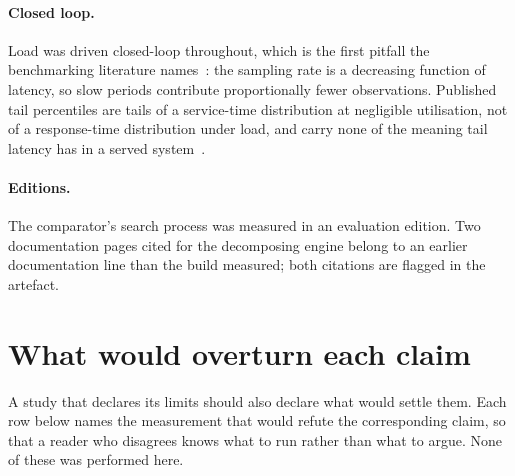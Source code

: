 \documentclass[11pt,a4paper]{article}
\begin{document}
\paragraph{Closed loop.} Load was driven closed-loop throughout, which is the first pitfall the
benchmarking literature names~\cite{schroeder2006openclosed,raasveldt2018fair}: the sampling rate is a
decreasing function of latency, so slow periods contribute proportionally fewer observations. Published tail percentiles are tails of a service-time
distribution at negligible utilisation, not of a response-time distribution under load, and carry none
of the meaning tail latency has in a served system~\cite{dean2013tail}.

\paragraph{Editions.} The comparator's search process was measured in an evaluation edition. Two
documentation pages cited for the decomposing engine belong to an earlier documentation line than
the build measured; both citations are flagged in the artefact.

\section{What would overturn each claim}
\label{sec:falsify}

A study that declares its limits should also declare what would settle them. Each row below names
the measurement that would refute the corresponding claim, so that a reader who disagrees knows what
to run rather than what to argue. None of these was performed here.
\end{document}
